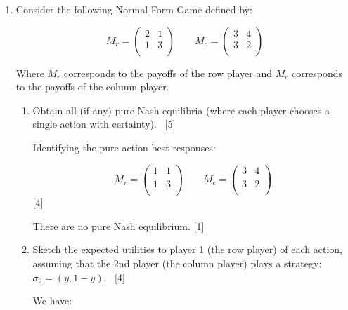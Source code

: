 \documentclass[12pt,a4paper,twoside]{article}
\begin{document}
\begin{enumerate}
\begin{enumerate}
\begin{itemize}
            \end{itemize}
                    ~\hfill{[5]}

        \item Consider the following Normal Form Game defined by:

            \[
                M_r=
\begin{pmatrix}
2 & 1 \\
1 & 3 \\
\end{pmatrix}
\qquad
            M_c=
\begin{pmatrix}
3 & 4 \\
3 & 2 \\
\end{pmatrix}
\]

            Where \(M_r\) corresponds to the payoffs of the row player and
            \(M_c\) corresponds to the payoffs of the column player.

            \begin{enumerate}
            \item Obtain all (if any) pure Nash equilibria (where each player chooses a single action with certainty).
            ~\hfill{[5]}

                \begin{solution}
                    Identifying the pure action best responses:

            \[
                M_r=
\begin{pmatrix}
    \underline{1} & 1 \\
    1 & \underline{3} \\
\end{pmatrix}
\qquad
M_c=
\begin{pmatrix}
    3 & \underline{4} \\
    \underline{3} & 2 \\
\end{pmatrix}
\]
                    \hfill{[4]}


                    There are no pure Nash equilibrium.
                    \hfill{[1]}
                \end{solution}


            \item Sketch the expected utilities to player 1 (the row player) of
                each action, assuming that the 2nd player (the column player) plays a strategy: 
                  $\sigma_2 = (y,1-y)$.
            ~\hfill{[4]}

                    \begin{solution}
                        We have:


\end{solution}
\end{enumerate}
\end{enumerate}
\end{enumerate}
\end{document}
